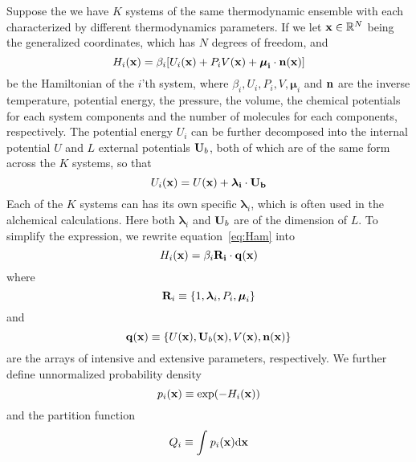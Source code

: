 Suppose the we have $K$ systems of the same thermodynamic ensemble with
each characterized by different thermodynamics parameters. If we let $\mathbf{x} \in
 \mathbb{R}^{N}$ being the generalized coordinates, which has $N$  degrees of 
 freedom, and
\begin{equation}\label{eq:Ham}
H_{i}(\mathbf{x}) = \beta_{i}[ U_{i}(\mathbf{x}) + P_{i}V(\mathbf{x}) + \mathbf{\boldsymbol\mu_{i}}\cdot\mathbf{\mathbf{n}(\mathbf{x})}]
\end{equation}
be the Hamiltonian of the $i$'th system, where $\beta_{i}, U_{i}, P_{i}, V, \boldsymbol\mu_{i}$
and $\mathbf{n}$ are the inverse temperature, potential energy, the pressure, the volume, the chemical
potentials for each system components and the number of molecules for each components, 
respectively. The potential energy $U_{i}$ can be further decomposed into 
the internal potential $U$ and $L$ external potentials $\mathbf{U}_{b}$, both 
of which are of the same form across the $K$ systems, so that 
\begin{equation}\label{eq:Pot}
U_{i}(\mathbf{x}) = U(\mathbf{x}) + \mathbf{\boldsymbol\lambda_{i}}\cdot\mathbf{\mathbf{U}_{b}}
\end{equation} 
Each of the $K$ systems can has its own specific $\boldsymbol\lambda_{i}$,  
which is often used in the alchemical calculations. Here both $\boldsymbol\lambda_{i}$ 
and $\mathbf{U}_{b}$ are of the dimension of $L$. To simplify the expression, 
we rewrite equation~\ref{eq:Ham} into
\begin{equation}\label{eq:simHam}
H_{i}(\mathbf{x}) = \beta_{i}\mathbf{\mathbf{R}_{i}}\cdot\mathbf{\mathbf{q}(\mathbf{x})}
\end{equation}
where 
\begin{equation}
\mathbf{R}_{i} \equiv \{1, \boldsymbol\lambda_{i}, P_{i}, \boldsymbol\mu_{i}\}
\label{eq:R}
\end{equation}
and
\begin{equation}
\mathbf{q}(\mathbf{x}) \equiv \{U(\mathbf{x}), \mathbf{U}_{b}(\mathbf{x}), V(\mathbf{x}), \mathbf{n}(\mathbf{x})\}
\label{eq:q}
\end{equation}
are the arrays of intensive and extensive parameters, respectively. 
We further define unnormalized probability density 
\begin{equation}\label{eq:p}
p_{i}(\mathbf{x}) \equiv \exp(-H_{i}(\mathbf{x}))
\end{equation}
and the partition function
\begin{equation}\label{eq:Q}
Q_{i} \equiv \int_{}^{}{p_{i}}(\mathbf{x})\mathrm{d}\mathbf{x} 
\end{equation}

